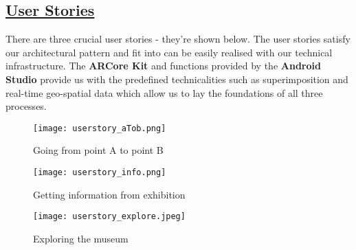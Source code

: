 \subsection*{\underline{User Stories}}
There are three crucial user stories - they're shown below.
The user stories satisfy our architectural pattern and fit into can be easily realised with our technical infrastructure. The \textbf{ARCore Kit} and functions provided by the \textbf{Android Studio} provide us with the predefined technicalities such as superimposition and real-time geo-spatial data which allow us to lay the foundations of all three processes.
\begin{figure}[t]
    \centering
    \texttt{[image: userstory\_aTob.png]}
    \caption{Going from point A to point B}
    \texttt{[image: userstory\_info.png]}
    \caption{Getting information from exhibition}
    \texttt{[image: userstory\_explore.jpeg]}
    \caption{Exploring the museum}
    \label{fig:my_label}
\end{figure}
